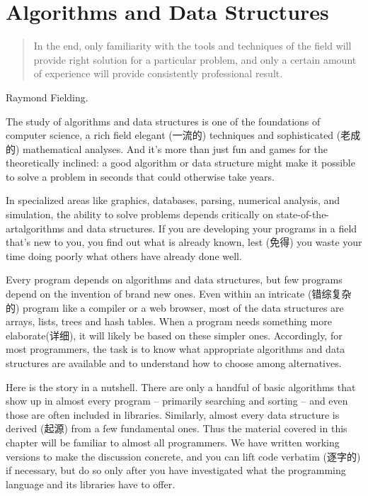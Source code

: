 \chapter{Algorithms and Data Structures}
\label{chap:alds}
\begin{quote}
    In the end, only familiarity with the tools and techniques of the field
    will provide right solution for a particular problem, and only a
    certain amount of experience will provide consistently professional
    result.
\end{quote}
\begin{quotesrc}
    Raymond Fielding.
\end{quotesrc}
The study of algorithms and data structures is one of the foundations of
computer science, a rich field elegant (一流的) techniques and
sophisticated (老成的) mathematical analyses. And it's more than just fun
and games for the theoretically inclined: a good algorithm or data
structure might make it possible to solve a problem in seconds that could
otherwise take years.

In specialized areas like graphics, databases, parsing, numerical analysis,
and simulation, the ability to solve problems depends critically on
state-of-the-artalgorithms and data structures. If you are developing your
programs in a field that's new to you, you  find out
what is already known, lest (免得) you waste your time doing poorly what
others have already done well.

Every program depends on algorithms and data structures, but few programs
depend on the invention of brand new ones. Even within an intricate
(错综复杂的) program like a compiler or a web browser, most of the data
structures are arrays, lists, trees and hash tables. When a program needs
something more elaborate(详细), it will likely be based on these simpler
ones. Accordingly, for most programmers, the task is to know what
appropriate algorithms and data structures are available and to understand
how to choose among alternatives.

Here is the story in a nutshell. There are only a handful of basic
algorithms that show up in almost every program -- primarily searching and
sorting -- and even those are often included in libraries. Similarly,
almost every data structure is derived (起源) from a few fundamental ones.
Thus the material covered in this chapter will be familiar to almost all
programmers. We have written working versions to make the discussion
concrete, and you can lift code verbatim (逐字的) if necessary, but do so
only after you have investigated what the programming language and its
libraries have to offer.

